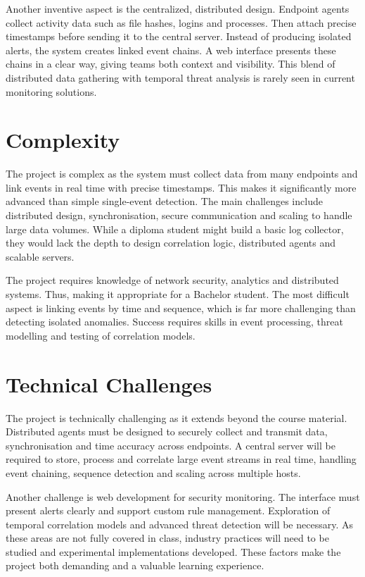 \documentclass[conference]{IEEEtran}
\begin{document}
Another inventive aspect is the centralized, distributed design. Endpoint agents collect activity data such as file hashes, logins and processes. Then attach precise timestamps before sending it to the central server. Instead of producing isolated alerts, the system creates linked event chains. A web interface presents these chains in a clear way, giving teams both context and visibility. This blend of distributed data gathering with temporal threat analysis is rarely seen in current monitoring solutions.

\section{Complexity}

The project is complex as the system must collect data from many endpoints and link events in real time with precise timestamps. This makes it significantly more advanced than simple single-event detection. The main challenges include distributed design, synchronisation, secure communication and scaling to handle large data volumes. While a diploma student might build a basic log collector, they would lack the depth to design correlation logic, distributed agents and scalable servers.

The project requires knowledge of network security, analytics and distributed systems. Thus, making it appropriate for a Bachelor student. The most difficult aspect is linking events by time and sequence, which is far more challenging than detecting isolated anomalies. Success requires skills in event processing, threat modelling and testing of correlation models.

\section{Technical Challenges}

The project is technically challenging as it extends beyond the course material. Distributed agents must be designed to securely collect and transmit data, synchronisation and time accuracy across endpoints. A central server will be required to store, process and correlate large event streams in real time, handling event chaining, sequence detection and scaling across multiple hosts.

Another challenge is web development for security monitoring. The interface must present alerts clearly and support custom rule management. Exploration of temporal correlation models and advanced threat detection will be necessary. As these areas are not fully covered in class, industry practices will need to be studied and experimental implementations developed. These factors make the project both demanding and a valuable learning experience.
\end{document}
